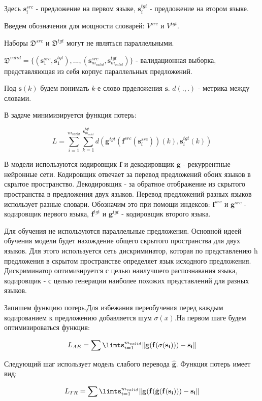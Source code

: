 \documentclass[12pt,twoside]{article}
\begin{document}
Здесь $\mathbf{s}_i^{src}$ - предложение на первом языке, $\mathbf{s}_i^{tgt}$ - предложение на втором языке.

Введем обозначения для мощности словарей: $V^{src}$ и $V^{tgt}$.

Наборы $\mathfrak{D}^{src}$ и $\mathfrak{D}^{tgt}$ могут не являться параллельными.

$\mathfrak{D}^{valid}=\{(\mathbf{s}_1^{src},\mathbf{s}_1^{tgt}),...,(\mathbf{s}_{m_{valid}}^{src},\mathbf{s}_{m_{valid}}^{tgt})\}$ - валидационная выборка, представляющая из себя корпус параллельных предложений.

Под $\mathbf{s}(k)$ будем понимать $k$-е слово прделожения $\mathbf{s}$. $d(.,.)$ - метрика между словами.

В задаче минимизируется функция потерь:

$$L=\sum\limits_{i=1}^{m_{valid}}\sum\limits_{k=1}^{\mathbf{s}_{m_{valid}}^{tgt}}d(\mathbf{g}^{tgt}(\mathbf{f}^{src}(\mathbf{s}_{i}^{src}))(k),\mathbf{s}_i^{tgt}(k))$$

В модели используются кодировщик $\mathbf{f}$ и декодировщик $\mathbf{g}$ - рекуррентные нейронные сети. Кодировщик отвечает за перевод предложений обоих языков в скрытое пространство. Декодировщик - за обратное отображение из скрытого пространства в предложения двух языков.  Перевод предложений разных языков использует разные словари. Обозначим это при помощи индексов: $\mathbf{f}^{src}$ и $\mathbf{g}^{src}$ - кодировщик первого языка, $\mathbf{f}^{tgt}$ и $\mathbf{g}^{tgt}$ - кодировщик второго языка.

Для обучения не используются параллельные предложения. Основной идеей обучения модели будет нахождение общего скрытого пространства для двух языков. Для этого используется сеть дискриминатор, которая по представлению h предложения в скрытом пространстве определяет язык исходного предложения. Дискриминатор оптимизируется с целью наилучшего распознавания языка, кодировщик - с целью генерации наиболее похожих представлений для разных языков. 

Запишем функцию потерь.Для избежания переобучения перед каждым кодированием к предложению добавляется шум $\sigma(x)$.На первом шаге будем оптимизироваться функция:

$$L_{AE}=\sum\limts_{i=1}^{m_{valid}}\|\mathbf{g}(\mathbf{f}(\sigma(\mathbf{s_i}))) - \mathbf{s_i}\|$$

Следующий шаг использует модель слабого перевода $\hat{\mathbf{g}}$. Функция потерь имеет вид:

$$L_{TR}=\sum\limts_{i=1}^{m_{valid}}\|\mathbf{g}(\mathbf{f}(\hat{\mathbf{g}}(\mathbf{f}(\mathbf{s_i})))-\mathbf{s_i}\|$$
 
\end{document}
